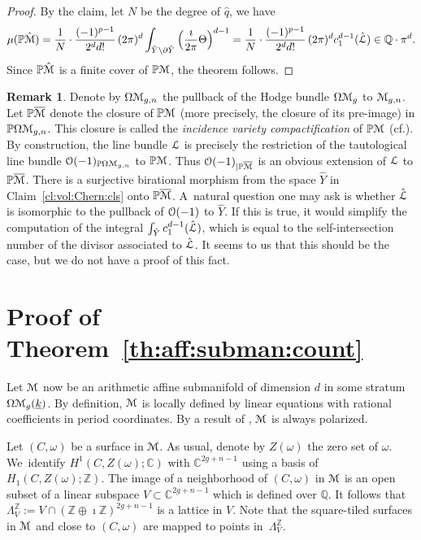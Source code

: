 \documentclass[11pt]{article}
\newcommand{\cf}{cf.\xspace}
\numberwithin{equation}{section}
\let\mathcal\EuScript
\theoremstyle{plain}
\theoremstyle{definition}
\newtheorem{Remark}[Theorem]{Remark}
\def\C{\mathbb{C}}
\newcommand\Z{\mathbb{Z}}
\newcommand{\Q}{\mathbb{Q}}
\newcommand{\Pb}{\mathbb{P}}
\newcommand{\Lcal}{\mathcal{L}}
\newcommand{\Mcal}{\mathcal{M}}
\newcommand{\Ocal}{\mathcal{O}}
\newcommand{\cL}{\mathcal{L}}
\newcommand{\cM}{\mathcal{M}}
\let\omg\omega
\let\ol\overline
\let\ul\underline
\newcommand{\trate}{\Omega\Mcal_{g}(\ul{k})}
\begin{document}
\begin{proof}
By the claim, let $N$ be the degree of $\hat{q}$, we have
\[
\mu(\Pb\hat{\cM})=\frac{1}{N}\cdot\frac{(-1)^{p-1}}{2^d d!}\,(2\pi)^d\int_{\hat{Y}\setminus\partial\hat{Y}}\left(\frac{\imath}{2\pi}\Theta\right)^{d-1} = \frac{1}{N}\cdot\frac{(-1)^{p-1}}{2^d d!}\,(2\pi)^d c_1^{d-1}(\hat{\cL})\in \Q\cdot\pi^d.
\]
Since $\Pb\hat{\cM}$ is a finite cover of $\Pb\cM$, the theorem follows.
\end{proof}

\begin{Remark}\label{rk:compare:ext:line:bdl}
Denote by $\Omega\Mcal_{g,n}$ the pullback of the Hodge bundle $\Omega\Mcal_g$ to $\Mcal_{g,n}$.
Let $\Pb\ol{\cM}$ denote the closure of $\Pb\Mcal$ (more precisely, the closure of its pre-image) in $\Pb\Omega\Mcal_{g,n}$.
This closure is called the \emph{incidence variety compactification} of $\Pb\cM$ (\cf \cite{BCGGM:abel}).
By construction, the line bundle $\Lcal$ is precisely the restriction of the tautological line bundle $\Ocal(-1)_{\Pb\Omega\Mcal_{g,n}}$ to $\Pb\cM$.
Thus $\Ocal(-1)_{|\Pb\ol{\Mcal}}$ is an obvious extension of $\Lcal$ to $\Pb\ol{\Mcal}$.
There is a surjective birational morphism from the space $\hat{Y}$ in Claim~\ref{cl:vol:Chern:cls} onto $\Pb\ol{\Mcal}$.
A~natural question one may ask is whether $\hat{\Lcal}$ is isomorphic to the pullback of $\Ocal(-1)$ to $\hat{Y}$.
If this is true, it would simplify the computation of the integral $\int_{\hat{Y}}c_1^{d-1}(\hat{\Lcal})$, which is equal to the self-intersection number of the divisor associated to $\hat{\Lcal}$.
It seems to us that this should be the case, but we do not have a proof of this fact.
\end{Remark}

\section{Proof of Theorem~\ref{th:aff:subman:count}}\label{sec:proof:theorem2}
Let $\Mcal$ now be an arithmetic affine submanifold of dimension $d$ in some stratum $\trate$.
By definition, $\Mcal$ is locally defined by linear equations with rational coefficients in period coordinates.
By a result of \cite{AEM17}, $\Mcal$ is always polarized.

Let $(C,\omega)$ be a surface in $\Mcal$. As usual, denote by $Z(\omega)$ the zero set of $\omega$.
We~identify $H^1(C,Z(\omg);\C)$ with $\C^{2g+n-1}$ using a basis of $H_1(C,Z(\omg);\Z)$.
The image of a neighborhood of $(C,\omega)$ in $\Mcal$ is an open subset of a linear subspace $V\subset \C^{2g+n-1}$ which is defined over $\Q$.
It follows that $\Lambda^\Z_V:=V\cap (\Z\oplus\imath\Z)^{2g+n-1}$ is a lattice in $V$.
Note that the square-tiled surfaces in $\cM$ and close to $(C,\omg)$ are mapped to points in~$\Lambda^\Z_V$.
\end{document}
